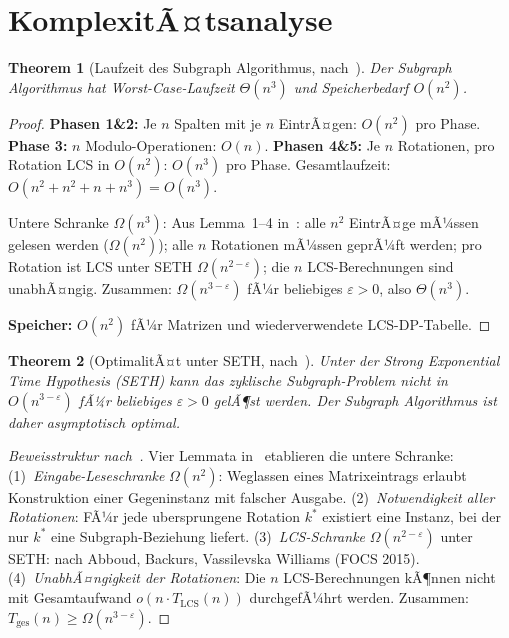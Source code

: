 ﻿\documentclass[12pt, a4paper, titlepage]{report}
\newtheorem{theorem}{Theorem}[section]
\theoremstyle{definition}
\theoremstyle{remark}
\begin{document}
\section{KomplexitÃ¤tsanalyse}

\begin{theorem}[Laufzeit des Subgraph Algorithmus, nach~\citep{epp2026subgraph}]
\label{thm:laufzeit_subgraph}
Der Subgraph Algorithmus hat Worst-Case-Laufzeit $\Theta(n^3)$ und
Speicherbedarf $O(n^2)$.
\end{theorem}

\begin{proof}
\textbf{Phasen 1\&2:} Je $n$ Spalten mit je $n$ EintrÃ¤gen: $O(n^2)$ pro Phase.
\textbf{Phase 3:} $n$ Modulo-Operationen: $O(n)$.
\textbf{Phasen 4\&5:} Je $n$ Rotationen, pro Rotation LCS in $O(n^2)$: $O(n^3)$
pro Phase. Gesamtlaufzeit: $O(n^2+n^2+n+n^3) = O(n^3)$.

Untere Schranke $\Omega(n^3)$: Aus Lemma~1--4 in~\citep{epp2026subgraph}:
alle $n^2$ EintrÃ¤ge mÃ¼ssen gelesen werden ($\Omega(n^2)$); alle $n$ Rotationen
mÃ¼ssen geprÃ¼ft werden; pro Rotation ist LCS unter SETH $\Omega(n^{2-\varepsilon})$;
die $n$ LCS-Berechnungen sind unabhÃ¤ngig. Zusammen: $\Omega(n^{3-\varepsilon})$
fÃ¼r beliebiges $\varepsilon > 0$, also $\Theta(n^3)$.

\textbf{Speicher:} $O(n^2)$ fÃ¼r Matrizen und wiederverwendete LCS-DP-Tabelle.
\end{proof}

\begin{theorem}[OptimalitÃ¤t unter SETH, nach~\citep{epp2026subgraph}]
\label{thm:optimalitaet_subgraph}
Unter der Strong Exponential Time Hypothesis (SETH) kann das zyklische
Subgraph-Problem nicht in $O(n^{3-\varepsilon})$ fÃ¼r beliebiges $\varepsilon > 0$
gelÃ¶st werden. Der Subgraph Algorithmus ist daher asymptotisch \emph{optimal}.
\end{theorem}

\begin{proof}[Beweisstruktur nach~\citep{epp2026subgraph}]
Vier Lemmata in~\citep{epp2026subgraph} etablieren die untere Schranke:
(1)~\emph{Eingabe-Leseschranke} $\Omega(n^2)$: Weglassen eines Matrixeintrags
erlaubt Konstruktion einer Gegeninstanz mit falscher Ausgabe.
(2)~\emph{Notwendigkeit aller Rotationen}: FÃ¼r jede ubersprungene Rotation $k^*$
existiert eine Instanz, bei der nur $k^*$ eine Subgraph-Beziehung liefert.
(3)~\emph{LCS-Schranke} $\Omega(n^{2-\varepsilon})$ unter SETH: nach Abboud,
Backurs, Vassilevska Williams (FOCS 2015).
(4)~\emph{UnabhÃ¤ngigkeit der Rotationen}: Die $n$ LCS-Berechnungen kÃ¶nnen nicht
mit Gesamtaufwand $o(n \cdot T_\mathrm{LCS}(n))$ durchgefÃ¼hrt werden.
Zusammen: $T_\mathrm{ges}(n) \geq \Omega(n^{3-\varepsilon})$.
\end{proof}
\end{document}
